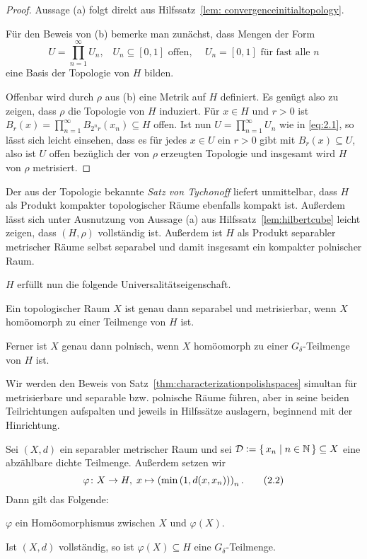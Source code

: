 \documentclass[../main/main.tex]{subfiles}
\begin{document}
	\begin{proof}
		Aussage (a) folgt direkt aus Hilfssatz~\ref{lem: convergenceinitialtopology}.
		
		Für den Beweis von (b) bemerke man zunächst, dass Mengen der Form 
		\[U = \prod_{n=1}^{\infty} U_n\text{,} \quad U_n \subseteq [0, 1] \text{ offen, }
		\quad U_n = [0, 1] \text{ für fast alle } n \label{eq:2.1} \tag{2.1}\]
		eine Basis der Topologie von $H$ bilden.
		
		Offenbar wird durch $\rho$ aus (b) eine Metrik auf $H$ definiert. 
		Es genügt also zu zeigen, dass $\rho$ die Topologie von $H$ induziert. 
		Für $x \in H$ und $r > 0$ ist 
		$B_r(x) = \prod_{n=1}^{\infty} B_{2^n r}(x_n) \subseteq H$ 
		offen. Ist nun $U = \prod_{n=1}^{\infty} U_n$ wie in \eqref{eq:2.1}, 
		so lässt sich leicht einsehen, dass es für jedes $x \in U$ ein $r > 0$ 
		gibt mit $B_r(x) \subseteq U$, also ist $U$ offen bezüglich der von $\rho$ 
		erzeugten Topologie und insgesamt wird $H$ von $\rho$ metrisiert.
	\end{proof}
	
	Der aus der Topologie bekannte \emph{Satz von Tychonoff} liefert 
	unmittelbar, dass $H$ als Produkt kompakter topologischer Räume 
	ebenfalls kompakt ist.
	Außerdem lässt sich unter Ausnutzung von Aussage (a) aus 
	Hilfssatz~\ref{lem:hilbertcube} leicht zeigen, dass $(H, \rho)$ 
	vollständig ist. Außerdem ist $H$ als Produkt separabler metrischer Räume selbst separabel und 
	damit insgesamt ein kompakter polnischer Raum.
	
	$H$ erfüllt nun die folgende Universalitätseigenschaft.
	
	\begin{Satz}
		\label{thm:characterizationpolishspaces}
		Ein topologischer Raum $X$ ist genau dann separabel und metrisierbar, wenn $X$ homöomorph zu einer Teilmenge von $H$ ist.
		
		Ferner ist $X$ genau dann polnisch, wenn $X$ homöomorph zu einer $G_\delta$-Teilmenge von $H$ ist.
	\end{Satz}
	
	Wir werden den Beweis von Satz~\ref{thm:characterizationpolishspaces} simultan für metrisierbare und separable bzw. polnische Räume führen, aber 
	in seine beiden Teilrichtungen aufspalten und jeweils in Hilfssätze auslagern, beginnend mit der Hinrichtung.
	
	\begin{Hilfssatz}
		\label{lem:characterizationpolishspaces}
		Sei $(X, d)$ ein separabler metrischer Raum und sei 
		$\mathcal{D} \vcentcolon = \left\{\, x_n \; \middle| \; n \in \mathbb{N} \,\right\} \subseteq X$ eine abzählbare 
		dichte Teilmenge. Außerdem setzen wir
		\[\varphi \colon X \to H, \; x \mapsto \left(\min \left(1, d(x, x_n) \right) \right)_n  \text{.} \label{eq:2.2} \tag{2.2}\]
		Dann gilt das Folgende:
		\begin{enumeratethm}
			\item $\varphi$ ein Homöomorphismus zwischen $X$ und $\varphi(X)$.
			\item Ist $(X, d)$ vollständig, so ist $\varphi(X) \subseteq H$ 
			eine $G_\delta$-Teilmenge.
		\end{enumeratethm}
	\end{Hilfssatz}
	
\end{document}
